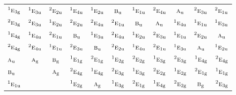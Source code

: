 \documentclass[10pt,a4paper]{article}
\numberwithin{equation}{section}
\newcommand{\irr}[1]{\text{\normalfont\scshape #1}}
\newcommand{\conjpair}[1]{{}^{#1}}
\newcommand{\ptag}[1]{\mathrm{#1}}
\begin{document}
{\begin{longtable}{@{}lcccccccccc@{}}
$\conjpair{1}\irr{e}_{3\ptag{g}}$ & $\conjpair{1}\irr{e}_{3\ptag{u}}$ & $\conjpair{2}\irr{e}_{2\ptag{u}}$ & $\conjpair{1}\irr{e}_{4\ptag{u}}$ & $\conjpair{1}\irr{e}_{2\ptag{u}}$ & $\irr{b}_{\ptag{u}}$ & $\conjpair{1}\irr{e}_{1\ptag{u}}$ & $\conjpair{2}\irr{e}_{4\ptag{u}}$ & $\irr{a}_{\ptag{u}}$ & $\conjpair{2}\irr{e}_{3\ptag{u}}$ & $\conjpair{2}\irr{e}_{1\ptag{u}}$\\
$\conjpair{2}\irr{e}_{3\ptag{g}}$ & $\conjpair{2}\irr{e}_{3\ptag{u}}$ & $\conjpair{1}\irr{e}_{2\ptag{u}}$ & $\conjpair{2}\irr{e}_{2\ptag{u}}$ & $\conjpair{2}\irr{e}_{4\ptag{u}}$ & $\conjpair{2}\irr{e}_{1\ptag{u}}$ & $\irr{b}_{\ptag{u}}$ & $\irr{a}_{\ptag{u}}$ & $\conjpair{1}\irr{e}_{4\ptag{u}}$ & $\conjpair{1}\irr{e}_{1\ptag{u}}$ & $\conjpair{1}\irr{e}_{3\ptag{u}}$\\
$\conjpair{1}\irr{e}_{4\ptag{g}}$ & $\conjpair{1}\irr{e}_{4\ptag{u}}$ & $\conjpair{2}\irr{e}_{1\ptag{u}}$ & $\irr{b}_{\ptag{u}}$ & $\conjpair{1}\irr{e}_{3\ptag{u}}$ & $\conjpair{2}\irr{e}_{4\ptag{u}}$ & $\conjpair{1}\irr{e}_{2\ptag{u}}$ & $\conjpair{2}\irr{e}_{3\ptag{u}}$ & $\conjpair{1}\irr{e}_{1\ptag{u}}$ & $\conjpair{2}\irr{e}_{2\ptag{u}}$ & $\irr{a}_{\ptag{u}}$\\
$\conjpair{2}\irr{e}_{4\ptag{g}}$ & $\conjpair{2}\irr{e}_{4\ptag{u}}$ & $\conjpair{1}\irr{e}_{1\ptag{u}}$ & $\conjpair{2}\irr{e}_{3\ptag{u}}$ & $\irr{b}_{\ptag{u}}$ & $\conjpair{2}\irr{e}_{2\ptag{u}}$ & $\conjpair{1}\irr{e}_{4\ptag{u}}$ & $\conjpair{2}\irr{e}_{1\ptag{u}}$ & $\conjpair{1}\irr{e}_{3\ptag{u}}$ & $\irr{a}_{\ptag{u}}$ & $\conjpair{1}\irr{e}_{2\ptag{u}}$\\
$\irr{a}_{\ptag{u}}$ & $\irr{a}_{\ptag{g}}$ & $\irr{b}_{\ptag{g}}$ & $\conjpair{1}\irr{e}_{1\ptag{g}}$ & $\conjpair{2}\irr{e}_{1\ptag{g}}$ & $\conjpair{1}\irr{e}_{2\ptag{g}}$ & $\conjpair{2}\irr{e}_{2\ptag{g}}$ & $\conjpair{1}\irr{e}_{3\ptag{g}}$ & $\conjpair{2}\irr{e}_{3\ptag{g}}$ & $\conjpair{1}\irr{e}_{4\ptag{g}}$ & $\conjpair{2}\irr{e}_{4\ptag{g}}$\\
$\irr{b}_{\ptag{u}}$ &  & $\irr{a}_{\ptag{g}}$ & $\conjpair{2}\irr{e}_{4\ptag{g}}$ & $\conjpair{1}\irr{e}_{4\ptag{g}}$ & $\conjpair{2}\irr{e}_{3\ptag{g}}$ & $\conjpair{1}\irr{e}_{3\ptag{g}}$ & $\conjpair{2}\irr{e}_{2\ptag{g}}$ & $\conjpair{1}\irr{e}_{2\ptag{g}}$ & $\conjpair{2}\irr{e}_{1\ptag{g}}$ & $\conjpair{1}\irr{e}_{1\ptag{g}}$\\
$\conjpair{1}\irr{e}_{1\ptag{u}}$ &  &  & $\conjpair{1}\irr{e}_{2\ptag{g}}$ & $\irr{a}_{\ptag{g}}$ & $\conjpair{1}\irr{e}_{3\ptag{g}}$ & $\conjpair{2}\irr{e}_{1\ptag{g}}$ & $\conjpair{1}\irr{e}_{4\ptag{g}}$ & $\conjpair{2}\irr{e}_{2\ptag{g}}$ & $\irr{b}_{\ptag{g}}$ & $\conjpair{2}\irr{e}_{3\ptag{g}}$\\

\end{longtable}}
\end{document}
